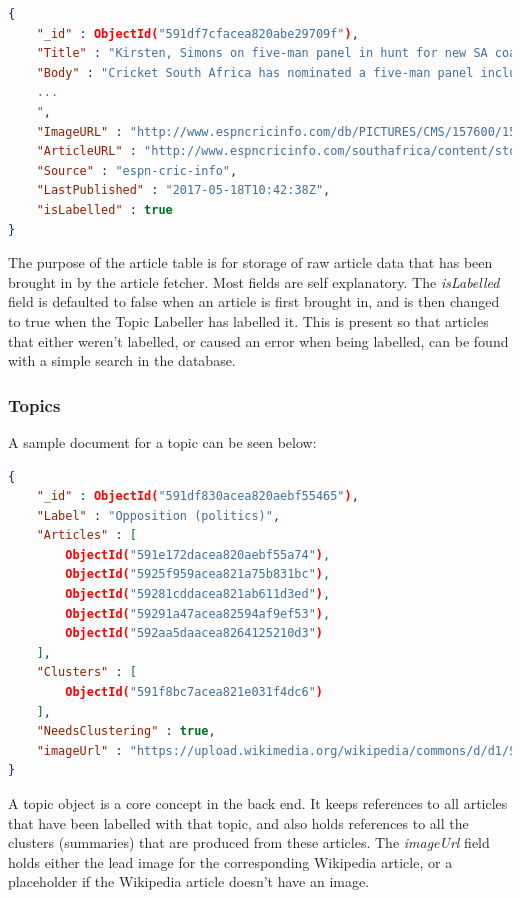 \documentclass[12pt]{article}
\begin{document}
\begin{lstlisting}[language=json, firstnumber=1, caption={A sample document in the Article table},captionpos=b]
{
    "_id" : ObjectId("591df7cfacea820abe29709f"),
    "Title" : "Kirsten, Simons on five-man panel in hunt for new SA coach",
    "Body" : "Cricket South Africa has nominated a five-man panel including two former national coaches, Gary Kirsten and Eric Simons, to recommend a suitable candidate for the position of head coach, which it aims to fill by the beginning of September
    ...
    ",
    "ImageURL" : "http://www.espncricinfo.com/db/PICTURES/CMS/157600/157626.5.jpg",
    "ArticleURL" : "http://www.espncricinfo.com/southafrica/content/story/1098337.html",
    "Source" : "espn-cric-info",
    "LastPublished" : "2017-05-18T10:42:38Z",
    "isLabelled" : true
}
\end{lstlisting}

The purpose of the article table is for storage of raw article data that has been brought in by the article fetcher. Most fields are self explanatory. The \emph{isLabelled} field is defaulted to false when an article is first brought in, and is then changed to true when the Topic Labeller has labelled it. This is present so that articles that either weren't labelled, or caused an error when being labelled, can be found with a simple search in the database.

\subsubsection{Topics}

A sample document for a topic can be seen below:

\begin{lstlisting}[language=json, firstnumber=1, caption={A sample document in the Topics table},captionpos=b]
{
    "_id" : ObjectId("591df830acea820aebf55465"),
    "Label" : "Opposition (politics)",
    "Articles" : [ 
        ObjectId("591e172dacea820aebf55a74"), 
        ObjectId("5925f959acea821a75b831bc"), 
        ObjectId("59281cddacea821ab611d3ed"), 
        ObjectId("59291a47acea82594af9ef53"), 
        ObjectId("592aa5daacea8264125210d3")
    ],
    "Clusters" : [ 
        ObjectId("591f8bc7acea821e031f4dc6")
    ],
    "NeedsClustering" : true,
    "imageUrl" : "https://upload.wikimedia.org/wikipedia/commons/d/d1/Stand_in_opposition_city_hall_boston.jpg"
}
\end{lstlisting}

A topic object is a core concept in the back end. It keeps references to all articles that have been labelled with that topic, and also holds references to all the clusters (summaries) that are produced from these articles. The \emph{imageUrl} field holds either the lead image for the corresponding Wikipedia \cite{wikipedia} article, or a placeholder if the Wikipedia article doesn't have an image. 
\end{document}
